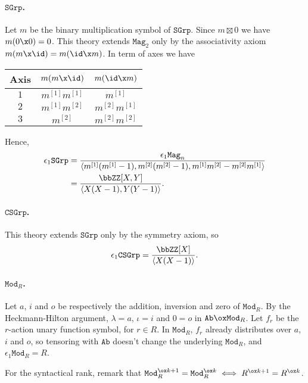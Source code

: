 \documentclass[a4paper, 12pt]{article}
\newcommand{\theory}{\mathtt}
\begin{document}
\paragraph*{$\theory{SGrp}$.} Let $m$ be the binary multiplication symbol of $\theory{SGrp}$. Since $m \boxtimes 0$ we have $m (0 \x 0) = 0$. This theory extends $\theory{Mag}_2$ only by the associativity axiom $m (m \x \id) = m (\id \x m)$. In term of axes we have
\begin{center} \begin{tabular}{|c|c|c|}
\hline
	Axis & $m (m \x \id)$ & $m (\id \x m)$ \\
\hline \hline
	$1$  & $m^{[1]} m^{[1]}$ & $m^{[1]}$ \\
\hline
	$2$  & $m^{[1]} m^{[2]}$ & $m^{[2]} m^{[1]}$ \\
\hline
	$3$  & $m^{[2]}$ & $m^{[2]} m^{[2]}$ \\
\hline
\end{tabular} \end{center}
Hence,
\begin{align*}
	\epsilon_1 \theory{SGrp} &= \frac{\epsilon_1 \theory{Mag}_n}{\langle m^{[1]} (m^{[1]} - 1), m^{[2]} (m^{[2]} - 1), m^{[1]} m^{[2]} - m^{[2]} m^{[1]} \rangle} \\
	&= \frac{\bbZZ [X, Y]}{\langle X(X-1), Y(Y-1)\rangle} .
\end{align*}

\paragraph*{$\theory{CSGrp}$.} This theory extends $\theory{SGrp}$ only by the symmetry axiom, so
\[ \epsilon_1 \theory{CSGrp} = \frac{\bbZZ [X]}{\langle X(X-1) \rangle} . \]

\paragraph*{$\theory{Mod}_R$.} Let $a$, $i$ and $o$ be respectively the addition, inversion and zero of $\theory{Mod}_R$. By the Heckmann-Hilton argument, $\lambda = a$, $\iota = i$ and $0 = o$ in $\theory{Ab} \ox \theory{Mod}_R$. Let $f_r$ be the $r$-action unary function symbol, for $r \in R$. In $\theory{Mod}_R$, $f_r$ already distributes over $a$, $i$ and $o$, so tensoring with $\theory{Ab}$ doesn't change the underlying $\theory{Mod}_R$, and $\epsilon_1 \theory{Mod}_R = R$.

For the syntactical rank, remark that $\theory{Mod}_R^{\ox k+1} = \theory{Mod}_R^{\ox k} \iff R^{\ox k+1} = R^{\ox k}$.
\end{document}
